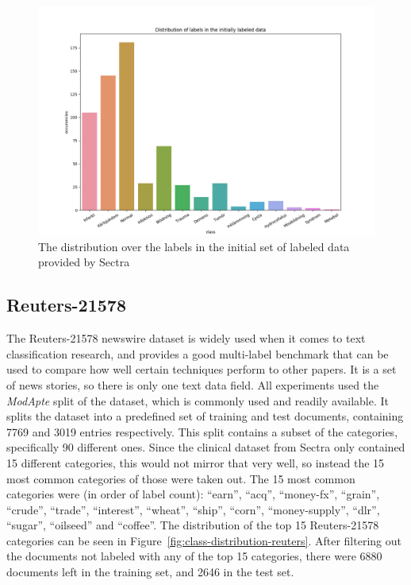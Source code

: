 \begin{figure}
    \includegraphics[width=\textwidth]{figures/class-distribution.png}
    \caption{The distribution over the labels in the initial set of labeled data provided by Sectra}
    \label{fig:class-distribution}
\end{figure}

\subsection{Reuters-21578}

The Reuters-21578 newswire dataset is widely used when it comes to text classification research, and provides a good multi-label benchmark that can be used to compare how well certain techniques perform to other papers.
It is a set of news stories, so there is only one text data field.
All experiments used the \textit{ModApte} split of the dataset, which is commonly used and readily available.
It splits the dataset into a predefined set of training and test documents, containing 7769 and 3019 entries respectively.
This split contains a subset of the categories, specifically 90 different ones.
Since the clinical dataset from Sectra only contained 15 different categories, this would not mirror that very well, so instead the 15 most common categories of those were taken out.
The 15 most common categories were (in order of label count): ``earn'', ``acq'', ``money-fx'', ``grain'', ``crude'', ``trade'', ``interest'', ``wheat'', ``ship'', ``corn'', ``money-supply'', ``dlr'', ``sugar'', ``oilseed'' and ``coffee''.
The distribution of the top 15 Reuters-21578 categories can be seen in Figure~\ref{fig:class-distribution-reuters}.
After filtering out the documents not labeled with any of the top 15 categories, there were 6880 documents left in the training set, and 2646 in the test set.

